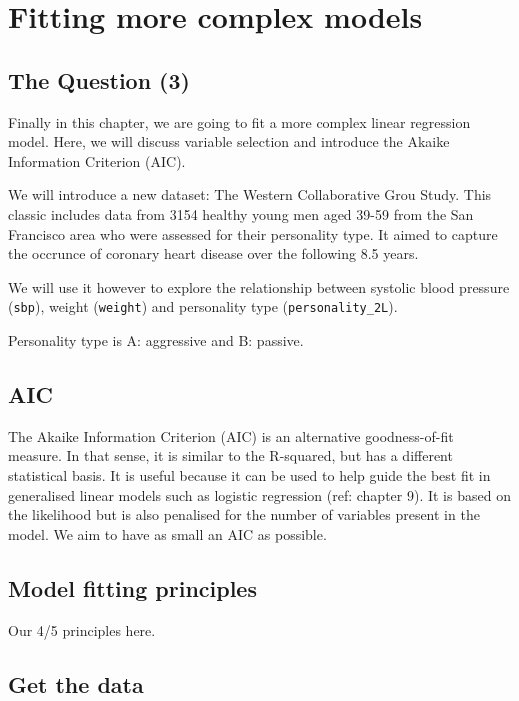 \documentclass[12pt,]{krantz}
\theoremstyle{definition}
\theoremstyle{definition}
\theoremstyle{definition}
\theoremstyle{remark}
\begin{document}
\hypertarget{fitting-more-complex-models}{%
\section{Fitting more complex
models}\label{fitting-more-complex-models}}

\hypertarget{the-question-3}{%
\subsection{The Question (3)}\label{the-question-3}}

Finally in this chapter, we are going to fit a more complex linear
regression model. Here, we will discuss variable selection and introduce
the Akaike Information Criterion (AIC).

We will introduce a new dataset: The Western Collaborative Grou Study.
This classic includes data from 3154 healthy young men aged 39-59 from
the San Francisco area who were assessed for their personality type. It
aimed to capture the occrunce of coronary heart disease over the
following 8.5 years.

We will use it however to explore the relationship between systolic
blood pressure (\texttt{sbp}), weight (\texttt{weight}) and personality
type (\texttt{personality\_2L}).

Personality type is A: aggressive and B: passive.

\hypertarget{aic}{%
\subsection{AIC}\label{aic}}

The Akaike Information Criterion (AIC) is an alternative goodness-of-fit
measure. In that sense, it is similar to the R-squared, but has a
different statistical basis. It is useful because it can be used to help
guide the best fit in generalised linear models such as logistic
regression (ref: chapter 9). It is based on the likelihood but is also
penalised for the number of variables present in the model. We aim to
have as small an AIC as possible.

\hypertarget{model-fitting-principles}{%
\subsection{Model fitting principles}\label{model-fitting-principles}}

Our 4/5 principles here.

\hypertarget{get-the-data-2}{%
\subsection{Get the data}\label{get-the-data-2}}
\end{document}
